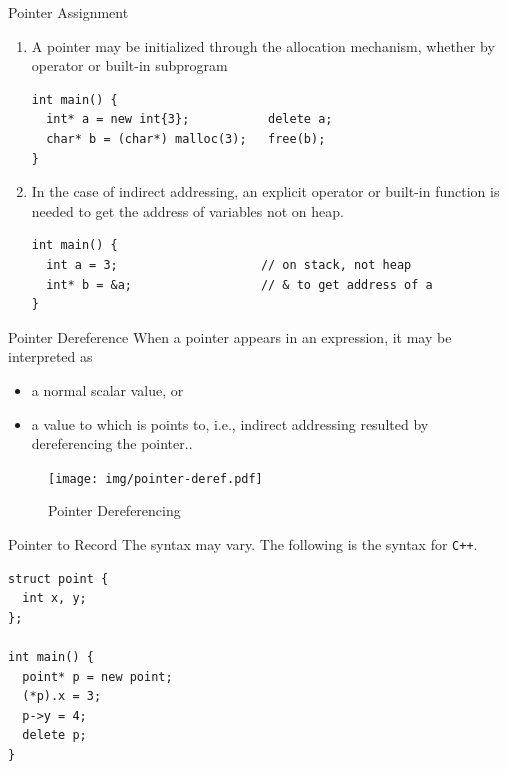 \documentclass[presentation]{beamer}
\begin{document}
\begin{frame}[fragile,label={sec:orgheadline49}]{Pointer Assignment}
 \begin{enumerate}
\item A pointer may be initialized through the allocation mechanism,
whether by operator or built-in subprogram

\begin{verbatim}
int main() {
  int* a = new int{3};           delete a;
  char* b = (char*) malloc(3);   free(b);
}
\end{verbatim}

\item In the case of indirect addressing, an explicit operator or
built-in function is needed to get the address of variables not
on heap.

\begin{verbatim}
int main() {
  int a = 3;                    // on stack, not heap
  int* b = &a;                  // & to get address of a
}
\end{verbatim}
\end{enumerate}
\end{frame}

\begin{frame}[label={sec:orgheadline50}]{Pointer Dereference}
When a pointer appears in an expression, it may be interpreted as
\begin{itemize}
\item a normal scalar value, or
\item a value to which is points to, i.e., indirect addressing resulted
by dereferencing the pointer..
\end{itemize}


\begin{figure}[htb]
\centering
\texttt{[image: img/pointer-deref.pdf]}
\caption{Pointer Dereferencing}
\end{figure}
\end{frame}

\begin{frame}[fragile,label={sec:orgheadline51}]{Pointer to Record}
 The syntax may vary.  The following is the syntax for \texttt{C++}.

\begin{verbatim}
struct point {
  int x, y;
};

int main() {
  point* p = new point;
  (*p).x = 3;
  p->y = 4;
  delete p;
}
\end{verbatim}
\end{frame}
\end{document}
